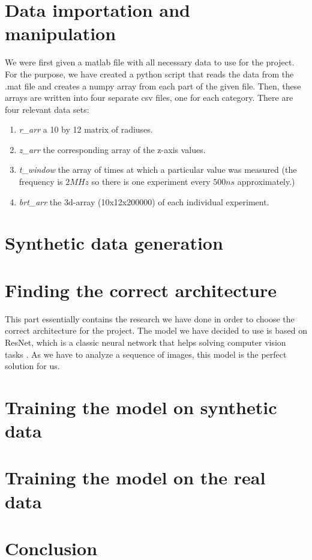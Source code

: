 \documentclass[10pt,conference,compsocconf]{IEEEtran}
\begin{document}
\section{Data importation and manipulation}
We were first given a matlab file with all necessary data to use for the project. For the purpose, we have created a python script that reads the data from the .mat file and creates a numpy array from each part of the given file. Then, these arrays are written into four separate csv files, one for each category. There are four relevant data sets:
\begin{enumerate}
  \item \textit{r\_arr} a 10 by 12 matrix of radiuses.
  \item \textit{z\_arr} the corresponding array of the z-axis values.
  \item \textit{t\_window} the array of times at which a particular value was measured (the frequency is $2MHz$ so there is one experiment every $500ns$ approximately.)
  \item \textit{brt\_arr} the 3d-array (10x12x200000) of each individual experiment.
\end{enumerate}

\section{Synthetic data generation}

\section{Finding the correct architecture}
This part essentially contains the research we have done in order to choose the correct architecture for the project. The model we have decided to use is based on ResNet, which is a classic neural network that helps solving computer vision tasks \cite{hara3dcnns}. As we have to analyze a sequence of images, this model is the perfect solution for us.

\section{Training the model on synthetic data}

\section{Training the model on the real data}

\section{Conclusion}



\end{document}
